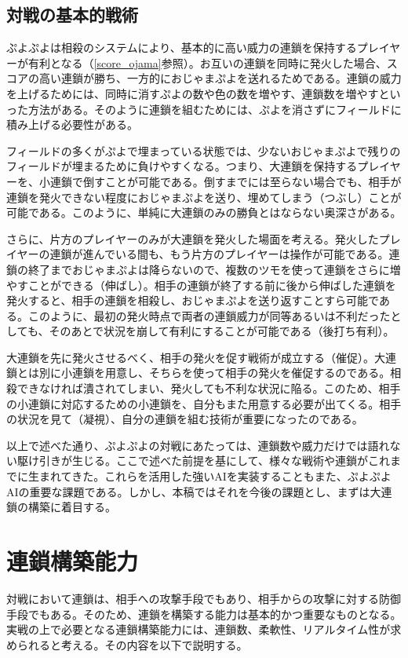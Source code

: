 \documentclass[12pt]{jsarticle}
\begin{document}
\subsection{対戦の基本的戦術} \label{senzyutu}
ぷよぷよは相殺のシステムにより、基本的に高い威力の連鎖を保持するプレイヤーが有利となる（\ref{score_ojama}参照）。お互いの連鎖を同時に発火した場合、スコアの高い連鎖が勝ち、一方的におじゃまぷよを送れるためである。連鎖の威力を上げるためには、同時に消すぷよの数や色の数を増やす、連鎖数を増やすといった方法がある。そのように連鎖を組むためには、ぷよを消さずにフィールドに積み上げる必要性がある。

フィールドの多くがぷよで埋まっている状態では、少ないおじゃまぷよで残りのフィールドが埋まるために負けやすくなる。つまり、大連鎖を保持するプレイヤーを、小連鎖で倒すことが可能である。倒すまでには至らない場合でも、相手が連鎖を発火できない程度におじゃまぷよを送り、埋めてしまう（つぶし）ことが可能である。このように、単純に大連鎖のみの勝負とはならない奥深さがある。

さらに、片方のプレイヤーのみが大連鎖を発火した場面を考える。発火したプレイヤーの連鎖が進んでいる間も、もう片方のプレイヤーは操作が可能である。連鎖の終了までおじゃまぷよは降らないので、複数のツモを使って連鎖をさらに増やすことができる（伸ばし）。相手の連鎖が終了する前に後から伸ばした連鎖を発火すると、相手の連鎖を相殺し、おじゃまぷよを送り返すことすら可能である。このように、最初の発火時点で両者の連鎖威力が同等あるいは不利だったとしても、そのあとで状況を崩して有利にすることが可能である（後打ち有利）。

大連鎖を先に発火させるべく、相手の発火を促す戦術が成立する（催促）。大連鎖とは別に小連鎖を用意し、そちらを使って相手の発火を催促するのである。相殺できなければ潰されてしまい、発火しても不利な状況に陥る。このため、相手の小連鎖に対応するための小連鎖を、自分もまた用意する必要が出てくる。相手の状況を見て（凝視）、自分の連鎖を組む技術が重要になったのである。

以上で述べた通り、ぷよぷよの対戦にあたっては、連鎖数や威力だけでは語れない駆け引きが生じる。ここで述べた前提を基にして、様々な戦術や連鎖がこれまでに生まれてきた。これらを活用した強いAIを実装することもまた、ぷよぷよAIの重要な課題である。しかし、本稿ではそれを今後の課題とし、まずは大連鎖の構築に着目する。


\section{連鎖構築能力}
対戦において連鎖は、相手への攻撃手段でもあり、相手からの攻撃に対する防御手段でもある。そのため、連鎖を構築する能力は基本的かつ重要なものとなる。実戦の上で必要となる連鎖構築能力には、連鎖数、柔軟性、リアルタイム性が求められると考える。その内容を以下で説明する。
\end{document}
